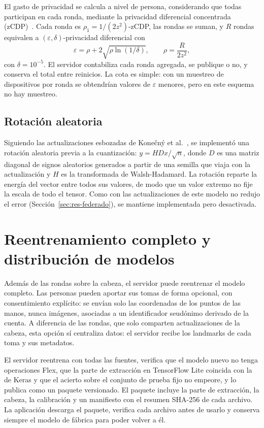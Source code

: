 El gasto de privacidad se calcula a nivel de persona, considerando que todas participan en cada ronda, mediante la privacidad diferencial concentrada (zCDP)~\cite{bun2016zcdp}. Cada ronda es $\rho_1 = 1/(2z^2)$-zCDP, las rondas se suman, y $R$ rondas equivalen a $(\varepsilon, \delta)$-privacidad diferencial con
\begin{equation}
    \varepsilon = \rho + 2\sqrt{\rho \ln(1/\delta)}, \qquad \rho = \frac{R}{2z^2},
\end{equation}
con $\delta = 10^{-5}$. El servidor contabiliza cada ronda agregada, se publique o no, y conserva el total entre reinicios. La cota es simple: con un muestreo de dispositivos por ronda se obtendrían valores de $\varepsilon$ menores, pero en este esquema no hay muestreo.

\subsection{Rotación aleatoria}

Siguiendo las actualizaciones esbozadas de Kone\v{c}n\'y et al.~\cite{konecny2016}, se implementó una rotación aleatoria previa a la cuantización: $y = H D x / \sqrt{n}$, donde $D$ es una matriz diagonal de signos aleatorios generados a partir de una semilla que viaja con la actualización y $H$ es la transformada de Walsh-Hadamard. La rotación reparte la energía del vector entre todos sus valores, de modo que un valor extremo no fije la escala de todo el tensor. Como con las actualizaciones de este modelo no redujo el error (Sección~\ref{sec:res-federado}), se mantiene implementada pero desactivada.

\section{Reentrenamiento completo y distribución de modelos}

Además de las rondas sobre la cabeza, el servidor puede reentrenar el modelo completo. Las personas pueden aportar sus tomas de forma opcional, con consentimiento explícito: se envían solo las coordenadas de los puntos de las manos, nunca imágenes, asociadas a un identificador seudónimo derivado de la cuenta. A diferencia de las rondas, que solo comparten actualizaciones de la cabeza, esta opción sí centraliza datos: el servidor recibe los landmarks de cada toma y sus metadatos.

El servidor reentrena con todas las fuentes, verifica que el modelo nuevo no tenga operaciones Flex, que la parte de extracción en TensorFlow Lite coincida con la de Keras y que el acierto sobre el conjunto de prueba fijo no empeore, y lo publica como un paquete versionado. El paquete incluye la parte de extracción, la cabeza, la calibración y un manifiesto con el resumen SHA-256 de cada archivo. La aplicación descarga el paquete, verifica cada archivo antes de usarlo y conserva siempre el modelo de fábrica para poder volver a él.

